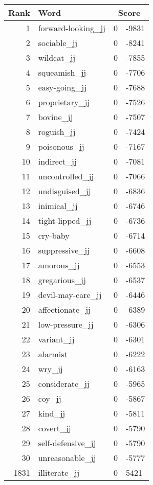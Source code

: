\begin{longtable}[!htbp]{| rlr@{.}l |}
    \hline
    \textbf{Rank} & \textbf{Word} & \multicolumn{2}{c|}{\textbf{Score}} \\
    \hline
    \endhead
    1 & forward-looking\_jj & 0 & -9831 \\
    2 & sociable\_jj & 0 & -8241 \\
    3 & wildcat\_jj & 0 & -7855 \\
    4 & squeamish\_jj & 0 & -7706 \\
    5 & easy-going\_jj & 0 & -7688 \\
    6 & proprietary\_jj & 0 & -7526 \\
    7 & bovine\_jj & 0 & -7507 \\
    8 & roguish\_jj & 0 & -7424 \\
    9 & poisonous\_jj & 0 & -7167 \\
    10 & indirect\_jj & 0 & -7081 \\
    11 & uncontrolled\_jj & 0 & -7066 \\
    12 & undisguised\_jj & 0 & -6836 \\
    13 & inimical\_jj & 0 & -6746 \\
    14 & tight-lipped\_jj & 0 & -6736 \\
    15 & cry-baby & 0 & -6714 \\
    16 & suppressive\_jj & 0 & -6608 \\
    17 & amorous\_jj & 0 & -6553 \\
    18 & gregarious\_jj & 0 & -6537 \\
    19 & devil-may-care\_jj & 0 & -6446 \\
    20 & affectionate\_jj & 0 & -6389 \\
    21 & low-pressure\_jj & 0 & -6306 \\
    22 & variant\_jj & 0 & -6301 \\
    23 & alarmist & 0 & -6222 \\
    24 & wry\_jj & 0 & -6163 \\
    25 & considerate\_jj & 0 & -5965 \\
    26 & coy\_jj & 0 & -5867 \\
    27 & kind\_jj & 0 & -5811 \\
    28 & covert\_jj & 0 & -5790 \\
    29 & self-defensive\_jj & 0 & -5790 \\
    30 & unreasonable\_jj & 0 & -5777 \\
    1831 & illiterate\_jj & 0 & 5421 \\

\end{longtable}
